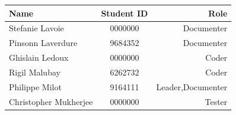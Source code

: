 \documentclass{article}
\begin{document}
\medskip
\begin{center}
\begin{tabular}{| l | c | r |}
\hline
Name & Student ID & Role \\
\hline
\hline
Stefanie Lavoie & 0000000 & Documenter\\
\hline
Pinsonn Laverdure & 9684352 & Documenter\\
\hline
Ghislain Ledoux & 0000000 & Coder\\
\hline
Rigil Malubay & 6262732 & Coder\\
\hline
Philippe Milot & 9164111 & Leader,Documenter \\
\hline
Christopher Mukherjee & 0000000 & Tester\\
\hline
\end{tabular}
\end{center}
\end{document}
